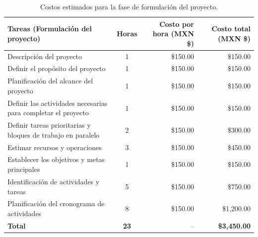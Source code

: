 \begin{table}[H]
	\centering
	\renewcommand{\arraystretch}{1.6}
	\setlength{\tabcolsep}{10pt}
	\Huge
	\begin{adjustbox}{max width=\textwidth}
		\begin{tabular}{|p{8cm}|c|r|r|}
			\hline
			\textbf{Tareas (Formulación del proyecto)} & \textbf{Horas} & \textbf{Costo por hora (MXN \$)} & \textbf{Costo total (MXN \$)} \\ \hline
			Descripción del proyecto & 1 & \$150.00 & \$150.00 \\ \hline
			Definir el propósito del proyecto & 1 & \$150.00 & \$150.00 \\ \hline
			Planificación del alcance del proyecto & 1 & \$150.00 & \$150.00 \\ \hline
			Definir las actividades necesarias para completar el proyecto & 1 & \$150.00 & \$150.00 \\ \hline
			Definir tareas prioritarias y bloques de trabajo en paralelo & 2 & \$150.00 & \$300.00 \\ \hline
			Estimar recursos y operaciones & 3 & \$150.00 & \$450.00 \\ \hline
			Establecer los objetivos y metas principales & 1 & \$150.00 & \$150.00 \\ \hline
			Identificación de actividades y tareas & 5 & \$150.00 & \$750.00 \\ \hline
			Planificación del cronograma de actividades & 8 & \$150.00 & \$1,200.00 \\ \hline
			\textbf{Total} & \textbf{23} & -- & \textbf{\$3,450.00} \\ \hline
		\end{tabular}
	\end{adjustbox}
	\caption{Costos estimados para la fase de formulación del proyecto.}
	\label{tab:costos_formulacion_nuevo}
\end{table}


